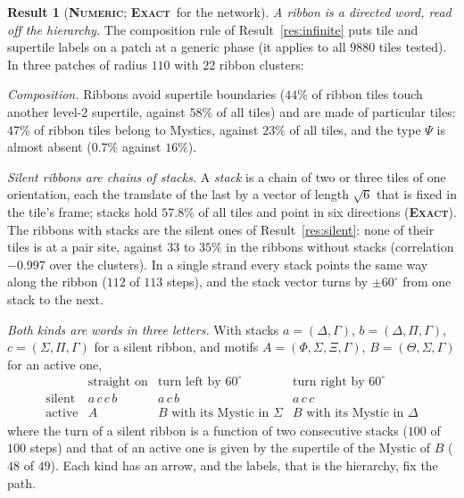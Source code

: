 \documentclass[11pt]{article}
\newcommand{\exact}{\textbf{\textsc{Exact}}}
\newcommand{\numeric}{\textbf{\textsc{Numeric}}}
\theoremstyle{definition}
\newtheorem{result}{Result}
\begin{document}
\begin{result}[\numeric; \exact\ for the network]\label{res:words}
\emph{A ribbon is a directed word, read off the hierarchy.} The composition rule of Result~\ref{res:infinite} puts tile and supertile labels on a patch at a generic phase (it applies to all $9880$ tiles tested). In three patches of radius $110$ with $22$ ribbon clusters:

\emph{Composition.} Ribbons avoid supertile boundaries ($44\%$ of ribbon tiles touch another level-$2$ supertile, against $58\%$ of all tiles) and are made of particular tiles: $47\%$ of ribbon tiles belong to Mystics, against $23\%$ of all tiles, and the type $\Psi$ is almost absent ($0.7\%$ against $16\%$).

\emph{Silent ribbons are chains of stacks.} A \emph{stack} is a chain of two or three tiles of one orientation, each the translate of the last by a vector of length $\sqrt6$ that is fixed in the tile's frame; stacks hold $57.8\%$ of all tiles and point in six directions (\exact). The ribbons with stacks are the silent ones of Result~\ref{res:silent}: none of their tiles is at a pair site, against $33$ to $35\%$ in the ribbons without stacks (correlation $-0.997$ over the clusters). In a single strand every stack points the same way along the ribbon ($112$ of $113$ steps), and the stack vector turns by $\pm60^\circ$ from one stack to the next.

\emph{Both kinds are words in three letters.} With stacks $a=(\Delta,\Gamma)$, $b=(\Delta,\Pi,\Gamma)$, $c=(\Sigma,\Pi,\Gamma)$ for a silent ribbon, and motifs $A=(\Phi,\Sigma,\Xi,\Gamma)$, $B=(\Theta,\Sigma,\Gamma)$ for an active one,
\begin{equation}\label{eq:words}
\begin{array}{lccc}
 & \text{straight on} & \text{turn left by } 60^\circ & \text{turn right by } 60^\circ\\[2pt]
\text{silent} & a\,c\,c\,b & a\,c\,b & a\,c\,c\\
\text{active} & A & B \text{ with its Mystic in } \Sigma & B \text{ with its Mystic in } \Delta
\end{array}
\end{equation}
where the turn of a silent ribbon is a function of two consecutive stacks ($100$ of $100$ steps) and that of an active one is given by the supertile of the Mystic of $B$ ($48$ of $49$). Each kind has an arrow, and the labels, that is the hierarchy, fix the path.


\end{result}
\end{document}
